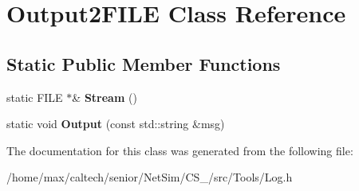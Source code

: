 \hypertarget{classOutput2FILE}{\section{\-Output2\-F\-I\-L\-E \-Class \-Reference}
\label{classOutput2FILE}
}
\subsection*{\-Static \-Public \-Member \-Functions}
\begin{DoxyCompactItemize}
\item 
\hypertarget{classOutput2FILE_a10f20b32157af0d88e5ad9710f2dbd6e}{static \-F\-I\-L\-E $\ast$\& {\bfseries \-Stream} ()}\label{classOutput2FILE_a10f20b32157af0d88e5ad9710f2dbd6e}

\item 
\hypertarget{classOutput2FILE_a4e36a13eb54de8a0c81a90156d66f021}{static void {\bfseries \-Output} (const std\-::string \&msg)}\label{classOutput2FILE_a4e36a13eb54de8a0c81a90156d66f021}

\end{DoxyCompactItemize}


\-The documentation for this class was generated from the following file\-:\begin{DoxyCompactItemize}
\item 
/home/max/caltech/senior/\-Net\-Sim/\-C\-S\-\_/src/\-Tools/\-Log.\-h\end{DoxyCompactItemize}

